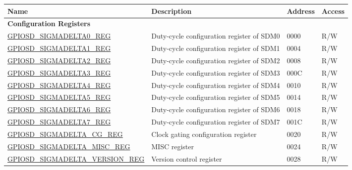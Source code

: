 \begin{longtable}{ | p{6cm} | p{7.2cm} | p{1.3cm} | p{1cm} | }
\hline\rowcolor{lightgray}
Name & Description &  Address & Access \\ \hline
\endhead
\multicolumn{4}{|l|}{\textbf{Configuration Registers}} \\ \hline
\hyperref[regdesc:GPIOSDSIGMADELTANREG]{GPIOSD\_SIGMADELTA0\_REG} & Duty-cycle configuration register of SDM0 & \hexprefix{}0000 & R/W \\ \hline
\hyperref[regdesc:GPIOSDSIGMADELTANREG]{GPIOSD\_SIGMADELTA1\_REG} & Duty-cycle configuration register of SDM1 & \hexprefix{}0004 & R/W \\ \hline
\hyperref[regdesc:GPIOSDSIGMADELTANREG]{GPIOSD\_SIGMADELTA2\_REG} & Duty-cycle configuration register of SDM2 & \hexprefix{}0008 & R/W \\ \hline
\hyperref[regdesc:GPIOSDSIGMADELTANREG]{GPIOSD\_SIGMADELTA3\_REG} & Duty-cycle configuration register of SDM3 & \hexprefix{}000C & R/W \\ \hline
\hyperref[regdesc:GPIOSDSIGMADELTANREG]{GPIOSD\_SIGMADELTA4\_REG} & Duty-cycle configuration register of SDM4 & \hexprefix{}0010 & R/W \\ \hline
\hyperref[regdesc:GPIOSDSIGMADELTANREG]{GPIOSD\_SIGMADELTA5\_REG} & Duty-cycle configuration register of SDM5 & \hexprefix{}0014 & R/W \\ \hline
\hyperref[regdesc:GPIOSDSIGMADELTANREG]{GPIOSD\_SIGMADELTA6\_REG} & Duty-cycle configuration register of SDM6 & \hexprefix{}0018 & R/W \\ \hline
\hyperref[regdesc:GPIOSDSIGMADELTANREG]{GPIOSD\_SIGMADELTA7\_REG} & Duty-cycle configuration register of SDM7 & \hexprefix{}001C & R/W \\ \hline
\hyperref[regdesc:GPIOSDSIGMADELTACGREG]{GPIOSD\_SIGMADELTA\_CG\_REG} & Clock gating configuration register & \hexprefix{}0020 & R/W \\ \hline
\hyperref[regdesc:GPIOSDSIGMADELTAMISCREG]{GPIOSD\_SIGMADELTA\_MISC\_REG} & MISC register & \hexprefix{}0024 & R/W \\ \hline
\hyperref[regdesc:GPIOSDSIGMADELTAVERSIONREG]{GPIOSD\_SIGMADELTA\_VERSION\_REG} & Version control register & \hexprefix{}0028 & R/W \\ \hline
\end{longtable}
